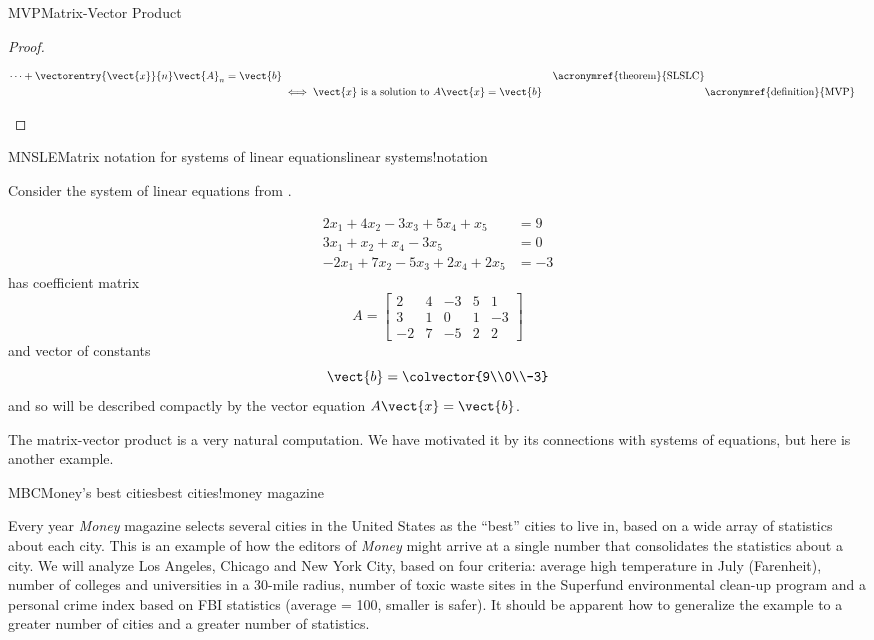 \begin{subsect}{MVP}{Matrix-Vector Product}
\begin{proof}
\begin{para}
\begin{align*}
\cdots+
\vectorentry{\vect{x}}{n}\vect{A}_n
=\vect{b}&&\text{\acronymref{theorem}{SLSLC}}\\
&\iff
\vect{x}\text{ is a solution to }A\vect{x}=\vect{b}&&\text{\acronymref{definition}{MVP}}
\end{align*}\end{para}
%
\end{proof}
%
\begin{example}{MNSLE}{Matrix notation for systems of linear equations}{linear systems!notation}
\begin{para}Consider the system of linear equations from .\end{para}
%
\begin{para}\begin{align*}
2x_1+4x_2-3x_3+5x_4+x_5&=9\\
3x_1+x_2+x_4-3x_5&=0\\
-2x_1+7x_2-5x_3+2x_4+2x_5&=-3
\end{align*}
%
has coefficient matrix
%
\begin{equation*}
A=
\begin{bmatrix}
2 & 4 & -3 & 5 & 1\\
3 & 1 & 0 & 1 & -3\\
-2 & 7 & -5 & 2 & 2
\end{bmatrix}
\end{equation*}
%
and vector of constants
%
\begin{equation*}
\vect{b}=\colvector{9\\0\\-3}
\end{equation*}
%
and so will be described compactly by the vector equation $A\vect{x}=\vect{b}$.
\end{para}
%
\end{example}
%
\begin{para}The matrix-vector product is a very natural computation.  We have motivated it by its connections with systems of equations, but here is another example.\end{para}
%
\begin{example}{MBC}{Money's best cities}{best cities!money magazine}
\begin{para}Every year {\sl Money} magazine selects several cities in the United States as the ``best'' cities to live in, based on a wide array of statistics about each city.  This is an example of how the editors of {\sl Money} might arrive at a single number that consolidates the statistics about a city.  We will analyze Los Angeles, Chicago and New York City, based on four criteria:  average high temperature in July (Farenheit), number of colleges and universities in a 30-mile radius, number of toxic waste sites in the Superfund environmental clean-up program and a personal crime index based on FBI statistics (average = 100, smaller is safer).  It should be apparent how to generalize the example to a greater number of cities and a greater number of statistics.\end{para}

\end{example}
\end{subsect}
